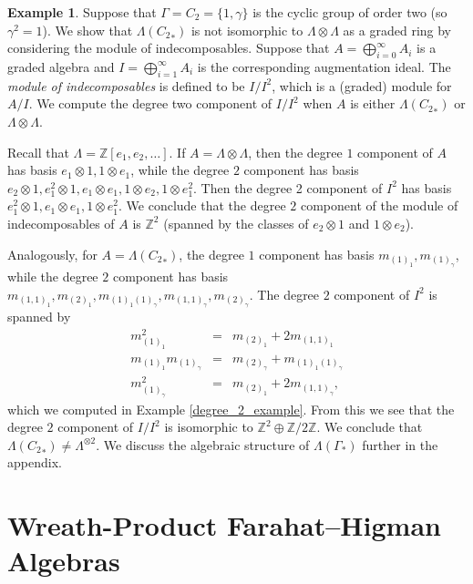 \documentclass[10pt]{article}
\theoremstyle{definition}
\newtheorem{example}[theorem]{Example}
\newcommand{\LambdaG}{\Lambda(\Gamma_*)}
\begin{document}
\begin{example}
Suppose that $\Gamma = C_2 = \{1, \gamma\}$ is the cyclic group of order two (so $\gamma^2=1$). We show that $\Lambda({C_2}_*)$ is not isomorphic to $\Lambda \otimes \Lambda$ as a graded ring by considering the module of indecomposables. Suppose that $A = \bigoplus_{i=0}^\infty A_i$ is a graded algebra and $I = \bigoplus_{i=1}^\infty A_i$ is the corresponding augmentation ideal. The \emph{module of indecomposables} is defined to be $I/I^2$, which is a (graded) module for $A/I$. We compute the degree two component of $I/I^2$ when $A$ is either $\Lambda({C_2}_*)$ or $\Lambda \otimes \Lambda$.

Recall that $\Lambda = \mathbb{Z}[e_1, e_2, \ldots]$. If $A = \Lambda \otimes \Lambda$, then the degree $1$ component of $A$ has basis $e_1 \otimes 1, 1 \otimes e_1$, while the degree $2$ component has basis $e_2 \otimes 1, e_1^2 \otimes 1, e_1 \otimes e_1, 1 \otimes e_2, 1 \otimes e_1^2$. Then the degree 2 component of $I^2$ has basis $e_1^2 \otimes 1, e_1 \otimes e_1, 1 \otimes e_1^2$. We conclude that the degree $2$ component of the module of indecomposables of $A$ is $\mathbb{Z}^2$ (spanned by the classes of $e_2 \otimes 1$ and $1 \otimes e_2$).

Analogously, for $A = \Lambda({C_2}_*)$, the degree $1$ component has basis $m_{(1)_1}, m_{(1)_\gamma}$, while the degree $2$ component has basis $m_{(1,1)_1}, m_{(2)_1}, m_{(1)_1 (1)_\gamma}, m_{(1,1)_\gamma}, m_{(2)_\gamma}$. The degree $2$ component of $I^2$ is spanned by 
\begin{eqnarray*}
m_{(1)_1}^2 &=& m_{(2)_1} + 2m_{(1,1)_1} \\
m_{(1)_1}m_{(1)_\gamma} &=&  m_{(2)_\gamma} + m_{(1)_1 (1)_\gamma} \\
m_{(1)_\gamma}^2 &=& m_{(2)_1} + 2 m_{(1,1)_\gamma},
\end{eqnarray*}
which we computed in Example \ref{degree_2_example}. From this we see that the degree $2$ component of $I/I^2$ is isomorphic to $\mathbb{Z}^{2} \oplus \mathbb{Z}/2\mathbb{Z}$. We conclude that $\Lambda({C_2}_*) \neq \Lambda^{\otimes 2}$. We discuss the algebraic structure of $\LambdaG$ further in the appendix.
\end{example}



\section{Wreath-Product Farahat--Higman Algebras} \label{rgamma_section}
\end{document}
